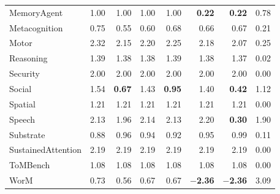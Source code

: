 \documentclass[10pt,landscape]{article}
\begin{document}
\begin{longtable}{@{}lrrrrrrr@{}}
MemoryAgent & 1.00 & 1.00 & 1.00 & 1.00 & \textbf{0.22} & \textbf{0.22} & 0.78 \\
Metacognition & 0.75 & 0.55 & 0.60 & 0.68 & 0.66 & 0.67 & 0.21 \\
Motor & 2.32 & 2.15 & 2.20 & 2.25 & 2.18 & 2.07 & 0.25 \\
Reasoning & 1.39 & 1.38 & 1.38 & 1.39 & 1.38 & 1.37 & 0.02 \\
Security & 2.00 & 2.00 & 2.00 & 2.00 & 2.00 & 2.00 & 0.00 \\
Social & 1.54 & \textbf{0.67} & 1.43 & \textbf{0.95} & 1.40 & \textbf{0.42} & 1.12 \\
Spatial & 1.21 & 1.21 & 1.21 & 1.21 & 1.21 & 1.21 & 0.00 \\
Speech & 2.13 & 1.96 & 2.14 & 2.13 & 2.20 & \textbf{0.30} & 1.90 \\
Substrate & 0.88 & 0.96 & 0.94 & 0.92 & 0.95 & 0.99 & 0.11 \\
SustainedAttention & 2.19 & 2.19 & 2.19 & 2.19 & 2.19 & 2.19 & 0.00 \\
ToMBench & 1.08 & 1.08 & 1.08 & 1.08 & 1.08 & 1.08 & 0.00 \\
WorM & 0.73 & 0.56 & 0.67 & 0.67 & \textbf{$-$2.36} & \textbf{$-$2.36} & 3.09 \\
\end{longtable}



\end{document}
